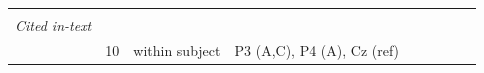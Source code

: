 \documentclass[11pt,]{memoir}
\begin{document}
\begin{longtable}[]{@{}lllllllll@{}}
\begin{minipage}[t]{0.04\columnwidth}
\strut
\end{minipage} & \begin{minipage}[t]{0.04\columnwidth}\raggedright
\strut
\end{minipage} & \begin{minipage}[t]{0.10\columnwidth}\raggedright
\strut
\end{minipage} & \begin{minipage}[t]{0.28\columnwidth}\raggedright
\strut
\end{minipage}\tabularnewline
\begin{minipage}[t]{0.09\columnwidth}\raggedright
\emph{Cited in-text}\strut
\end{minipage} & \begin{minipage}[t]{0.02\columnwidth}\raggedright
\strut
\end{minipage} & \begin{minipage}[t]{0.04\columnwidth}\raggedright
\strut
\end{minipage} & \begin{minipage}[t]{0.10\columnwidth}\raggedright
\strut
\end{minipage} & \begin{minipage}[t]{0.04\columnwidth}\raggedright
\strut
\end{minipage} & \begin{minipage}[t]{0.04\columnwidth}\raggedright
\strut
\end{minipage} & \begin{minipage}[t]{0.04\columnwidth}\raggedright
\strut
\end{minipage} & \begin{minipage}[t]{0.10\columnwidth}\raggedright
\strut
\end{minipage} & \begin{minipage}[t]{0.28\columnwidth}\raggedright
\strut
\end{minipage}\tabularnewline
\begin{minipage}[t]{0.09\columnwidth}\raggedright
\textcite{Sparing2009}\strut
\end{minipage} & \begin{minipage}[t]{0.02\columnwidth}\raggedright
10\strut
\end{minipage} & \begin{minipage}[t]{0.04\columnwidth}\raggedright
within
subject\strut
\end{minipage} & \begin{minipage}[t]{0.10\columnwidth}\raggedright
P3 (A,C), P4 (A), Cz
(ref)\strut
\end{minipage} & \begin{minipage}[t]{0.04\columnwidth}\raggedright

\end{minipage}
\end{longtable}
\end{document}
